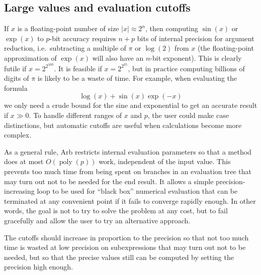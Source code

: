 \documentclass[10pt,journal,compsoc,cspaper]{IEEEtran}
\begin{document}
\subsection{Large values and evaluation cutoffs}

If $x$ is a floating-point number of size $|x| \approx 2^n$, then
computing
$\sin(x)$ or $\exp(x)$ to $p$-bit accuracy
requires $n+p$ bits of internal precision for
argument reduction, i.e.\ subtracting a multiple of $\pi$ or $\log(2)$ from $x$
(the floating-point approximation of $\exp(x)$ will also have an $n$-bit exponent).
This is clearly futile if $x = 2^{2^{100}}$.
It is feasible if $x = 2^{2^{35}}$, but in practice
computing billions of digits of $\pi$
is likely to be a waste of time.
For example, when evaluating the formula
\begin{equation}
\label{eq:logexpsum}
\log(x) + \sin(x) \exp(-x)
\end{equation}
we only need a crude bound for the sine and exponential to
get an accurate result if $x \gg 0$.
To handle different ranges of $x$ and $p$,
the user could make case
distinctions, but automatic cutoffs are useful when calculations become more
complex.

As a general rule, Arb restricts internal evaluation parameters
so that a method does at most $O(\operatorname{poly}(p))$ work,
independent of the input value. This prevents too much
time from being spent on branches in an evaluation tree that
may turn out not to be needed for the end result. It allows
a simple precision-increasing loop to be used for ``black box'' numerical evaluation
that can be terminated at any convenient point if it
fails to converge rapidly enough.
In other words, the goal is not to try to solve the problem at any cost,
but to fail gracefully and allow the user to try an alternative approach.

The cutoffs should increase in proportion to the precision so that
not too much time is wasted at low precision
on subexpressions that may turn out not to be needed,
but so that the precise values still can be computed by setting
the precision high enough.
\end{document}
